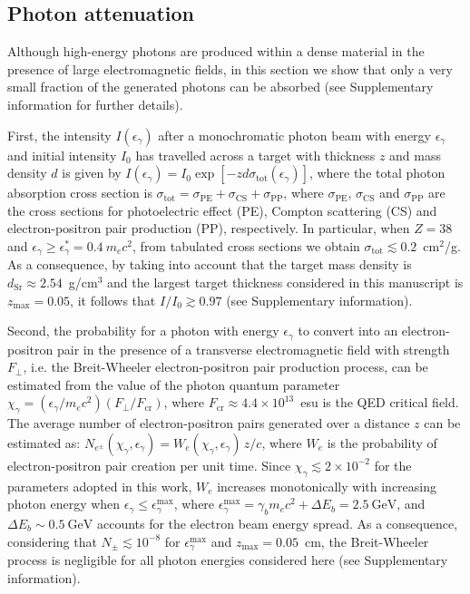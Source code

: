 \documentclass[fleqn,11pt]{wlscirep}
\begin{document}
\subsection*{Photon attenuation} 

Although high-energy photons are produced within a dense material in the presence of large electromagnetic fields, in this section we show that only a very small fraction of the generated photons can be absorbed (see Supplementary information for further details). 

First, the intensity $I(\epsilon_\gamma)$ after a monochromatic photon beam with energy $\epsilon_\gamma$ and initial intensity $I_0$ has travelled across a target with thickness $z$ and mass density $d$ is given by\cite{Olive:2016xmw} $I(\epsilon_\gamma)=I_0\exp\left[-zd\sigma_\text{tot}(\epsilon_\gamma)\right]$, where the total photon absorption cross section is $\sigma_\text{tot}=\sigma_\text{PE}+\sigma_\text{CS}+\sigma_\text{PP}$, where $\sigma_\text{PE}$, $\sigma_\text{CS}$ and $\sigma_\text{PP}$ are the cross sections for photoelectric effect (PE), Compton scattering (CS) and electron-positron pair production (PP), respectively. In particular, when $Z=38$ and $\epsilon_\gamma\geq \epsilon^*_\gamma=0.4~m_ec^2$, from tabulated cross sections we obtain\cite{XCOM} $\sigma_\text{tot}\lesssim0.2$~cm$^2$/g. As a consequence, by taking into account that the target mass density is $d_\text{Sr}\approx2.54$~g/cm$^3$ and the largest target thickness considered in this manuscript is $z_\text{max}=0.05$, it follows that $I/I_0\gtrsim0.97$ (see Supplementary information). 

Second, the probability for a photon with energy $\epsilon_\gamma$ to convert into an electron-positron pair in the presence of a transverse electromagnetic field with strength $F_\perp$, i.e. the Breit-Wheeler electron-positron pair production process, can be estimated from the value of the photon quantum parameter $\chi_\gamma= (\epsilon_\gamma/m_ec^2)(F_\perp/F_\text{cr})$, where $F_\text{cr}\approx4.4\times10^{13}$~esu is the QED critical field. The average number of electron-positron pairs generated over a distance $z$ can be estimated as: 
$N_{e^\pm}(\chi_\gamma,\epsilon_\gamma)=W_e(\chi_\gamma,\epsilon_\gamma)\,z/c$, where\cite{BaierBook} $W_e$ is the probability of electron-positron pair creation per unit time. Since $\chi_\gamma\lesssim2\times10^{-2}$ for the parameters adopted in this work, $W_e$ increases monotonically with increasing photon energy when $\epsilon_\gamma\leq\epsilon^\text{max}_\gamma$, where $\epsilon^\text{max}_\gamma=\gamma_bm_ec^2+\Delta E_b=2.5~\text{GeV}$, and $\Delta E_b\sim0.5~\text{GeV}$ accounts for the electron beam energy spread. As a consequence, considering that $N_\pm\lesssim10^{-8}$ for $\epsilon^\text{max}_\gamma$ and $z_\text{max}=0.05$~cm, the Breit-Wheeler process is negligible for all photon energies considered here (see Supplementary information).
\end{document}
